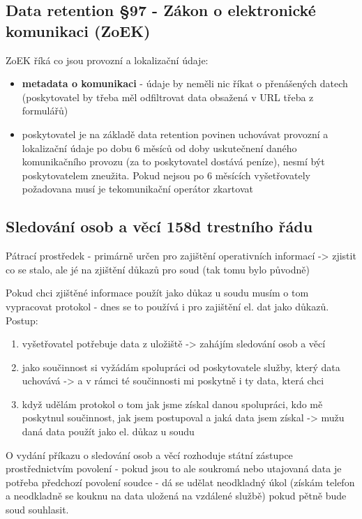 \subsection{Data retention §97 - Zákon o elektronické komunikaci (ZoEK)}
ZoEK říká co jsou provozní a lokalizační údaje:
\begin{itemize}
    \item \textbf{metadata o komunikaci} - údaje by neměli nic říkat o přenášených datech (poskytovatel by třeba měl odfiltrovat data obsažená v URL třeba z formulářů)
    \item  poskytovatel je na základě data retention povinen uchovávat provozní a lokalizační údaje po dobu 6 měsíců od doby uskutečnení daného komunikačního provozu (za to poskytovatel dostává peníze), nesmí být poskytovatelem zneužita. Pokud nejsou po 6 měsících vyšetřovately požadovana musí je tekomunikační operátor zkartovat
\end{itemize}

\subsection{Sledování osob a věcí 158d trestního řádu}
Pátrací prostředek - primárně určen pro zajištění operativních informací -> zjistit co se
stalo, ale jé na zjištění důkazů pro soud (tak tomu bylo původně)

Pokud chci zjištěné informace použít jako důkaz u soudu musím o tom vypracovat protokol - dnes se to používá i pro
zajištění el. dat jako důkazů. Postup:
\begin{enumerate}
    \item vyšetřovatel potřebuje data z uložiště -> zahájím sledování osob a věcí
    \item jako součinnost si vyžádám spolupráci od poskytovatele služby, který data uchovává -> a v rámci té součinnosti mi poskytně i ty data, která chci
    \item když udělám protokol o tom jak jsme získal danou spolupráci, kdo mě poskytnul součinnost, jak jsem postupoval a jaká data jsem získal -> mužu daná data použít jako el. důkaz u soudu
\end{enumerate}
O vydání příkazu o sledování osob a věcí rozhoduje státní zástupce prostřednictvím povolení - pokud jsou to ale soukromá nebo utajovaná data je potřeba předchozí povolení soudce - dá se udělat neodkladný úkol (získám telefon a neodkladně se kouknu na data uložená na vzdálené službě) pokud pětně bude soud souhlasit.
\newpage
